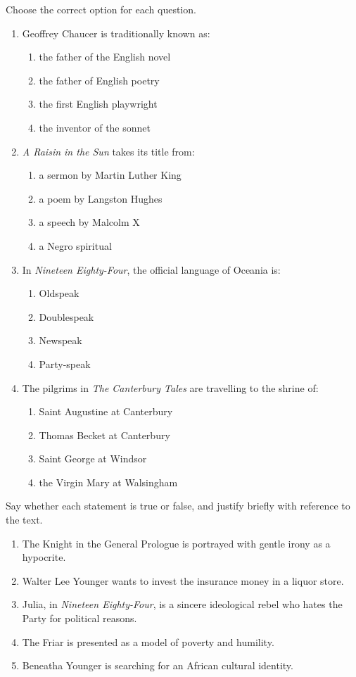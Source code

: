 \documentclass[11pt]{article}
\begin{document}
\begin{exercice}
Choose the correct option for each question.
\begin{enumerate}
\item Geoffrey Chaucer is traditionally known as:
\begin{enumerate}
\item the father of the English novel
\item the father of English poetry
\item the first English playwright
\item the inventor of the sonnet
\end{enumerate}
\item \emph{A Raisin in the Sun} takes its title from:
\begin{enumerate}
\item a sermon by Martin Luther King
\item a poem by Langston Hughes
\item a speech by Malcolm X
\item a Negro spiritual
\end{enumerate}
\item In \emph{Nineteen Eighty-Four}, the official language of Oceania is:
\begin{enumerate}
\item Oldspeak
\item Doublespeak
\item Newspeak
\item Party-speak
\end{enumerate}
\item The pilgrims in \emph{The Canterbury Tales} are travelling to the shrine of:
\begin{enumerate}
\item Saint Augustine at Canterbury
\item Thomas Becket at Canterbury
\item Saint George at Windsor
\item the Virgin Mary at Walsingham
\end{enumerate}
\end{enumerate}
\end{exercice}

\begin{exercice}
Say whether each statement is true or false, and justify briefly with reference to the text.
\begin{enumerate}
\item The Knight in the General Prologue is portrayed with gentle irony as a hypocrite.
\item Walter Lee Younger wants to invest the insurance money in a liquor store.
\item Julia, in \emph{Nineteen Eighty-Four}, is a sincere ideological rebel who hates the Party for political reasons.
\item The Friar is presented as a model of poverty and humility.
\item Beneatha Younger is searching for an African cultural identity.
\end{enumerate}
\end{exercice}
\end{document}
